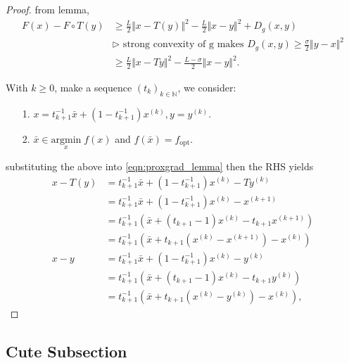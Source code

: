     \begin{proof}
        from lemma,
        \begin{align}
            F(x) - F\circ T(y) &\ge 
            \frac{L}{2}\Vert x - T (y)\Vert^2 - \frac{L}{2}\Vert x - y\Vert^2 + D_g(x, y)
            \\
            & \triangleright \text{ strong convexity of g makes }
            D_g(x, y) \ge \frac{\sigma}{2}\Vert y - x\Vert^2
            \\
            & \ge \frac{L}{2}\Vert x - Ty\Vert^2 - \frac{L - \sigma}{2}\Vert x - y\Vert^2. 
        \end{align}\label{eqn:proxgrad_lemma}

        With $k\ge 0$, make a sequence $(t_k)_{k\in \mathbb N}$, we consider:
        \begin{itemize}
            \item [1.] $x = t^{-1}_{k + 1}\bar x + (1 - t^{-1}_{k + 1})x^{(k)}, y = y^{(k)}$. 
            \item [2.] $\bar x \in \underset{x}{\text{argmin}}\; f(x)$ and $f(\bar x) = f_{\text{opt}}$. 
        \end{itemize}
        substituting the above into \hyperref[eqn:proxgrad_lemma]{\ref*{eqn:proxgrad_lemma}} then the RHS yields 
        \begin{align*}
            x - T(y) &=  t^{-1}_{k+1} \bar x + (1 - t^{-1}_{k+1}) x^{(k)} - T y^{(k)}
            \\
            &= t^{-1}_{k+1} \bar x + (1 - t^{-1}_{k+1}) x^{(k)} - x^{(k + 1)}
            \\
            &= t^{-1}_{k + 1}\left(
                \bar x + (t_{k+1} - 1)x^{(k)} - t_{k+1}x^{(k + 1)}
            \right)
            \\
            &= t^{-1}_{k + 1} \left(
                \bar x + t_{k+1} \left(
                    x^{(k)} - x^{(k + 1)}
                \right) - x^{(k)}
            \right)
            \\
            x - y &= t^{-1}_{k+1} \bar x + (1 - t_{k+1}^{-1}) x^{(k)} - y^{(k)}
            \\
            &= t^{-1}_{k + 1}\left(
                \bar x + (t_{k+1} - 1)x^{(k)} - t_{k+1} y^{(k)}
            \right)
            \\
            &= t^{-1}_{k + 1}
            \left(
                \bar x + t_{k+1} \left(
                    x^{(k)} - y^{(k)}
                \right) - x^{(k)}
            \right), 
        \end{align*}
        

    \end{proof}
    
        

\subsection{Cute Subsection}

